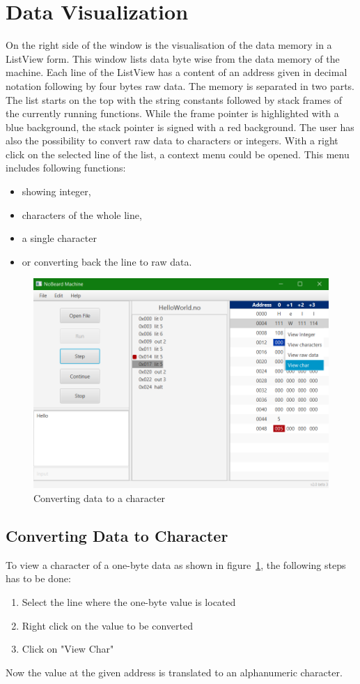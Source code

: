 \section{Data Visualization}
On the right side of the window is the visualisation of the data memory in a ListView form. This window lists data byte wise from the data memory of the machine. Each line of the ListView has a content of an address given in decimal notation following by four bytes raw data. The memory is separated in two parts. The list starts on the top with the string constants followed by stack frames of the currently running functions. While the frame pointer is highlighted with a blue background, the stack pointer is signed with a red background. The user has also the possibility to convert raw data to characters or integers.
With a right click on the selected line of the list, a context menu could be opened. This menu includes following functions:
\begin{itemize}
\item showing integer,
\item characters of the whole line, 
\item a single character 
\item or converting back the line to raw data. 
\end{itemize}
\begin{figure}[h] 
	\centering
	\includegraphics[scale=.60]{images/screenshot-3.png}
	\caption{Converting data to a character}
	\label{fig:convertToChar}
\end{figure}
\subsection{Converting Data to Character}
To view a character of a one-byte data as shown in figure~\ref{fig:convertToChar}, the following steps has to be done:
\begin{enumerate}
\item Select the line where the one-byte value is located 
\item Right click on the value to be converted
\item Click on "View Char" 
\end{enumerate}
Now the value at the given address is translated to an alphanumeric character. 
